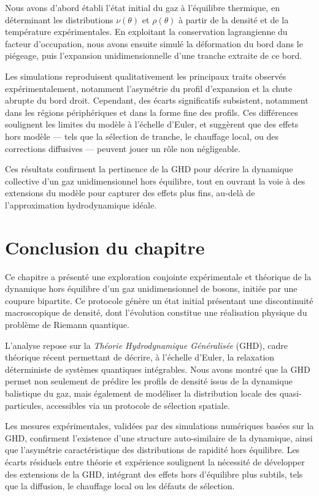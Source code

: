 Nous avons d’abord établi l’état initial du gaz à l’équilibre thermique, en déterminant les distributions $\nu(\theta)$ et $\rho(\theta)$ à partir de la densité et de la température expérimentales. En exploitant la conservation lagrangienne du facteur d’occupation, nous avons ensuite simulé la déformation du bord dans le piégeage, puis l’expansion unidimensionnelle d’une tranche extraite de ce bord.

Les simulations reproduisent qualitativement les principaux traits observés expérimentalement, notamment l’asymétrie du profil d’expansion et la chute abrupte du bord droit. Cependant, des écarts significatifs subsistent, notamment dans les régions périphériques et dans la forme fine des profils. Ces différences soulignent les limites du modèle à l’échelle d’Euler, et suggèrent que des effets hors modèle — tels que la sélection de tranche, le chauffage local, ou des corrections diffusives — peuvent jouer un rôle non négligeable.

Ces résultats confirment la pertinence de la GHD pour décrire la dynamique collective d’un gaz unidimensionnel hors équilibre, tout en ouvrant la voie à des extensions du modèle pour capturer des effets plus fins, au-delà de l’approximation hydrodynamique idéale.

\section*{Conclusion du chapitre}

Ce chapitre a présenté une exploration conjointe expérimentale et théorique de la dynamique hors équilibre d’un gaz unidimensionnel de bosons, initiée par une coupure bipartite. Ce protocole génère un état initial présentant une discontinuité macroscopique de densité, dont l’évolution constitue une réalisation physique du problème de Riemann quantique.

L’analyse repose sur la \emph{Théorie Hydrodynamique Généralisée} (GHD), cadre théorique récent permettant de décrire, à l’échelle d’Euler, la relaxation déterministe de systèmes quantiques intégrables. Nous avons montré que la GHD permet non seulement de prédire les profils de densité issus de la dynamique balistique du gaz, mais également de modéliser la distribution locale des quasi-particules, accessibles via un protocole de sélection spatiale.

Les mesures expérimentales, validées par des simulations numériques basées sur la GHD, confirment l’existence d’une structure auto-similaire de la dynamique, ainsi que l’asymétrie caractéristique des distributions de rapidité hors équilibre. Les écarts résiduels entre théorie et expérience soulignent la nécessité de développer des extensions de la GHD, intégrant des effets hors d’équilibre plus subtils, tels que la diffusion, le chauffage local ou les défauts de sélection.

